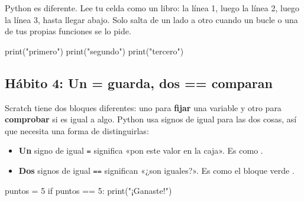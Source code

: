 Python es diferente. Lee tu celda como un libro: la línea 1, luego la línea 2, luego la línea 3, hasta llegar abajo. Solo salta de un lado a otro cuando un bucle o una de tus propias funciones se lo pide.

\begin{tcbraster}[raster columns=2, raster equal height=rows, raster column skip=12pt, raster valign=center]
\begin{tcolorbox}[colback=white, colframe=white, boxrule=0pt, valign=center]
\begin{scratch}
\end{scratch}
\end{tcolorbox}
\begin{code}
print("primero")
print("segundo")
print("tercero")
\end{code}
\end{tcbraster}

\subsection*{Hábito 4: Un = guarda, dos == comparan}

Scratch tiene dos bloques diferentes: uno para \textbf{fijar} una variable y otro para \textbf{comprobar} si es igual a algo. Python usa signos de igual para las dos cosas, así que necesita una forma de distinguirlas:

\begin{itemize}
  \item \textbf{Un} signo de igual \texttt{=} significa «pon este valor en la caja». Es como .
  \item \textbf{Dos} signos de igual \texttt{==} significan «¿son iguales?». Es como el bloque verde \chip[operators]{\ = \ }.
\end{itemize}

\begin{tcbraster}[raster columns=2, raster equal height=rows, raster column skip=12pt, raster valign=center]
\begin{tcolorbox}[colback=white, colframe=white, boxrule=0pt, valign=center]
\begin{scratch}
\end{scratch}
\end{tcolorbox}
\begin{code}
puntos = 5
if puntos == 5:
    print("¡Ganaste!")
\end{code}
\end{tcbraster}

